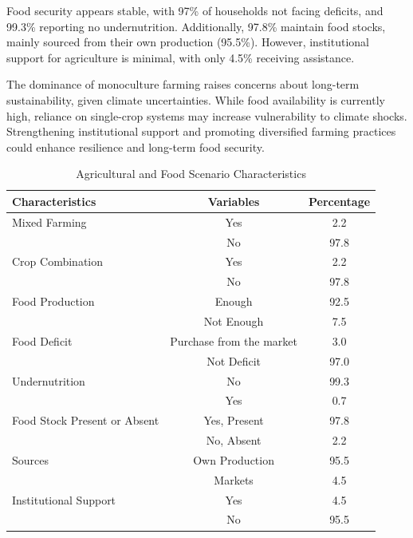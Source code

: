 Food security appears stable, with 97\% of households not facing deficits, and 99.3\% reporting no undernutrition. Additionally, 97.8\% maintain food stocks, mainly sourced from their own production (95.5\%). However, institutional support for agriculture is minimal, with only 4.5\% receiving assistance.

The dominance of monoculture farming raises concerns about long-term sustainability, given climate uncertainties. While food availability is currently high, reliance on single-crop systems may increase vulnerability to climate shocks. Strengthening institutional support and promoting diversified farming practices could enhance resilience and long-term food security.

\begin{table}[htbp]
    \centering
    \caption{Agricultural and Food Scenario Characteristics}
    \label{tab:agriculture_food_scenario}
    \begin{tabular}{@{}lcc@{}}
        \toprule
        \textbf{Characteristics} & \textbf{Variables} & \textbf{Percentage} \\
        \midrule
        Mixed Farming & Yes & 2.2 \\
                     & No & 97.8 \\
        Crop Combination & Yes & 2.2 \\
                         & No & 97.8 \\
        Food Production & Enough & 92.5 \\
                        & Not Enough & 7.5 \\
        Food Deficit & Purchase from the market & 3.0 \\
                     & Not Deficit & 97.0 \\
        Undernutrition & No & 99.3 \\
                       & Yes & 0.7 \\
        Food Stock Present or Absent & Yes, Present & 97.8 \\
                                     & No, Absent & 2.2 \\
        Sources & Own Production & 95.5 \\
                & Markets & 4.5 \\
        Institutional Support & Yes & 4.5 \\
                              & No & 95.5 \\
        \bottomrule
    \end{tabular}
\end{table}

